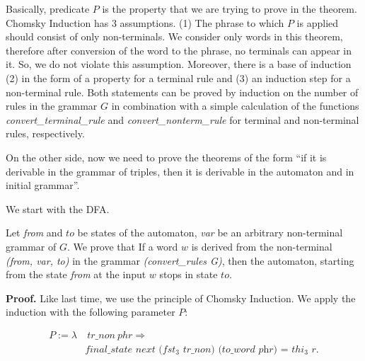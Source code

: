 Basically, predicate $P$ is the property that we are trying to prove in the theorem. Chomsky Induction has 3 assumptions.
(1) The phrase to which $P$ is applied should consist of only non-terminals. We consider only words in this theorem, therefore after conversion of the word to the phrase, no terminals can appear in it. So, we do not violate this assumption.
Moreover, there is a base of induction (2) in the form of a property for a terminal rule and (3) an induction step for a non-terminal rule.
Both statements can be proved by induction on the number of rules in the grammar $G$ in combination with a simple calculation of the functions \textit{convert\_terminal\_rule} and \textit{convert\_nonterm\_rule} for terminal and non-terminal rules, respectively.

On the other side, now we need to prove the theorems of the form  ``if it is derivable in the grammar of triples, then it is derivable in the automaton and in initial grammar''.

We start with the DFA.

\begin{theorem}
	Let \textit{from} and $to$ be states of the automaton, \textit{var} be an arbitrary non-terminal grammar of $G$. We prove that If a word $w$ is derived from the non-terminal \textit{(from, var, to)} in the grammar \textit{(convert\_rules G)}, then the automaton, starting from the state \textit{from} at the input $w$ stops in state $to$.
\end{theorem}

\textbf{Proof.} 
Like last time, we use the principle of Chomsky Induction.
We apply the induction with the following parameter $P$:

\begin{align*}
P :=  \lambda & \ \textit{tr\_non} \ phr \Rightarrow  \\
              & \textit{final\_state} \textit{\ next \ ($fst_3$ tr\_non) (to\_word \ phr) = $thi_3$ r}. 
\end{align*}

